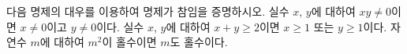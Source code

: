 다음 명제의 대우를 이용하여 명제가 참임을 증명하시오.
 실수 $x$, $y$에 대하여 $xy\ne 0$이면 $x\ne 0$이고 $y\ne 0$이다.
 실수 $x$, $y$에 대하여 $x+y\ge 2$이면 $x\ge 1$ 또는 $y\ge 1$이다.
 자연수 $m$에 대하여 $m^2$이 홀수이면 $m$도 홀수이다.
